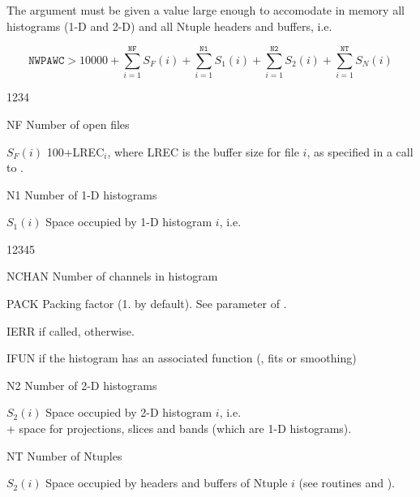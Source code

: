 The argument  must be given a value large enough
to accomodate in memory all histograms (1-D and 2-D) and all
Ntuple headers and buffers, i.e.

\[ \mathtt{NWPAWC} > 10000 + \sum_{i=1}^{\mathtt{NF}} S_F(i)
                           + \sum_{i=1}^{\mathtt{N1}} S_1(i)
                           + \sum_{i=1}^{\mathtt{N2}} S_2(i)
                           + \sum_{i=1}^{\mathtt{NT}} S_N(i)  \]

\begin{DLtt}{1234}
\item[NF]         Number of open files
\item[\(S_F(i)\)] 100+LREC\(_i\), where LREC is the buffer size for file \(i\),
                  as specified in a call to .
\item[N1]         Number of 1-D histograms
\item[\(S_1(i)\)] Space occupied by 1-D histogram \(i\), i.e.\\
                  \begin{DLtt}{12345}
                  \item[NCHAN] Number of channels in histogram
                  \item[PACK]  Packing factor (1. by default).
                               See parameter  of .
                  \item[IERR]   if  called,  otherwise.
                  \item[IFUN]   if the histogram has an associated function
                               (, fits or smoothing)
                  \end{DLtt}
\item[N2]         Number of 2-D histograms
\item[\(S_2(i)\)] Space occupied by 2-D histogram \(i\), i.e.\\
                   + space for projections,
                  slices and bands (which are 1-D histograms).
\item[NT]         Number of Ntuples
\item[\(S_2(i)\)] Space occupied by headers and buffers of Ntuple \(i\) 
                  (see routines  and ).
\end{DLtt}

